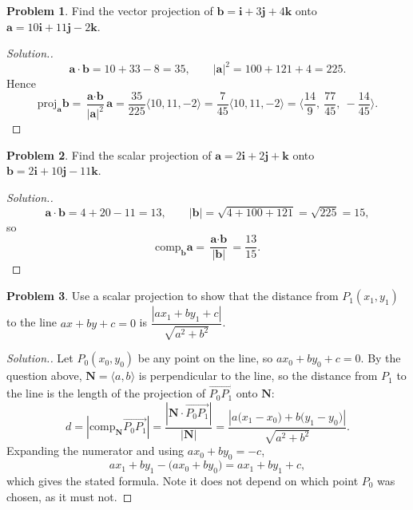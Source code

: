 \documentclass[11pt,a4paper]{article}
\theoremstyle{definition}
\newtheorem{problemx}{Problem}[subsection]
\newenvironment{problem}{\begin{problemx}}{\end{problemx}}
\newenvironment{solution}
  {\renewcommand{\qedsymbol}{}\begin{proof}[\textit{Solution}.]}
  {\end{proof}}
\begin{document}
\begin{problem}
Find the vector projection of
$\textbf{b} = \textbf{i}+3\textbf{j}+4\textbf{k}$ onto
$\textbf{a} = 10\textbf{i}+11\textbf{j}-2\textbf{k}$.
\end{problem}
\begin{solution}
$$\textbf{a}\cdot\textbf{b} = 10 + 33 - 8 = 35,\qquad
\left|\textbf{a}\right|^2 = 100+121+4 = 225 .$$
Hence
$$\text{proj}_{\textbf{a}}\textbf{b}
= \frac{\textbf{a}\cdot\textbf{b}}{\left|\textbf{a}\right|^2}\textbf{a}
= \frac{35}{225}\langle 10,11,-2\rangle
= \frac{7}{45}\langle 10,11,-2\rangle
= \Big\langle \frac{14}{9},\ \frac{77}{45},\ -\frac{14}{45}\Big\rangle .$$
\end{solution}

\begin{problem}
Find the scalar projection of $\textbf{a} = 2\textbf{i}+2\textbf{j}+\textbf{k}$
onto $\textbf{b} = 2\textbf{i}+10\textbf{j}-11\textbf{k}$.
\end{problem}
\begin{solution}
$$\textbf{a}\cdot\textbf{b} = 4 + 20 - 11 = 13,\qquad
\left|\textbf{b}\right| = \sqrt{4+100+121} = \sqrt{225} = 15 ,$$
so
$$\text{comp}_{\textbf{b}}\textbf{a}
= \frac{\textbf{a}\cdot\textbf{b}}{\left|\textbf{b}\right|} = \frac{13}{15}.$$
\end{solution}

\begin{problem}
Use a scalar projection to show that the distance from $P_1(x_1,y_1)$ to the
line $ax+by+c = 0$ is
$\dfrac{\left|ax_1+by_1+c\right|}{\sqrt{a^2+b^2}}$.
\end{problem}
\begin{solution}
Let $P_0(x_0,y_0)$ be any point on the line, so $ax_0+by_0+c = 0$. By the
question above, $\textbf{N} = \langle a,b\rangle$ is perpendicular to the line,
so the distance from $P_1$ to the line is the length of the projection of
$\overrightarrow{P_0P_1}$ onto $\textbf{N}$:
$$d = \left|\text{comp}_{\textbf{N}}\overrightarrow{P_0P_1}\right|
= \frac{\left|\textbf{N}\cdot\overrightarrow{P_0P_1}\right|}{\left|\textbf{N}\right|}
= \frac{\left|a\big(x_1-x_0\big) + b\big(y_1-y_0\big)\right|}{\sqrt{a^2+b^2}} .$$
Expanding the numerator and using $ax_0+by_0 = -c$,
$$a x_1 + b y_1 - \big(ax_0+by_0\big) = ax_1+by_1+c ,$$
which gives the stated formula. Note it does not depend on which point $P_0$ was
chosen, as it must not.
\end{solution}
\end{document}
